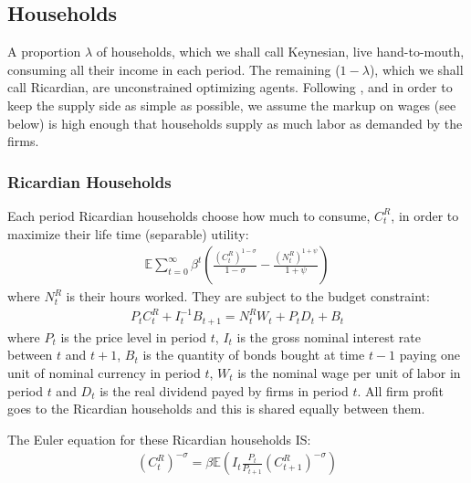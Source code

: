 \documentclass[12pt,a4paper]{article}
\begin{document}
\subsection{Households}
A proportion $\lambda$ of households, which we shall call Keynesian, live hand-to-mouth, consuming all their income in each period. The remaining ($1-\lambda$), which we shall call Ricardian, are unconstrained optimizing agents. Following \cite{dgHANKTANK}, and in order to keep the supply side as simple as possible, we assume the markup on wages (see below) is high enough that households supply as much labor as demanded by the firms.

\subsubsection{Ricardian Households}
Each period Ricardian households choose how much to consume, $C^R_t$, in order to maximize their life time (separable) utility:
\begin{align*}
\mathbb{E}\sum_{t=0}^{\infty}\beta^t \left(\frac{\left(C^R_t\right)^{1-\sigma}}{1-\sigma} - \frac{\left(N^R_t\right)^{1+\psi}}{1+\psi}\right)
\end{align*}
where $N^R_t$ is their hours worked. They are subject to the budget constraint:
\begin{align*}
P_t C^R_t + I_{t}^{-1}B_{t+1} =  N^R_t W_t + P_t D_t + B_t
\end{align*}
where $P_t$ is the price level in period $t$, $I_t$ is the gross nominal interest rate between $t$ and $t+1$, $B_t$ is the quantity of bonds bought at time $t-1$ paying one unit of nominal currency in period $t$, $W_t$ is the nominal wage per unit of labor in period $t$ and $D_t$ is the real dividend payed by firms in period $t$. All firm profit goes to the Ricardian households and this is shared equally between them.

The Euler equation for these Ricardian households IS:
\begin{align}
\left(C^R_t\right)^{-\sigma} = \beta \mathbb{E}\left(I_t\frac{P_{t}}{P_{t+1}} \left(C^R_{t+1}\right)^{-\sigma}\right)	\label{euler_R}
\end{align}
\end{document}
